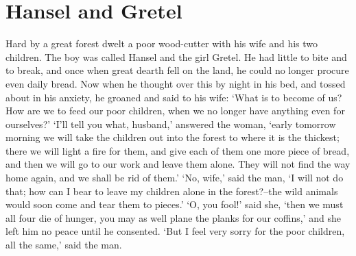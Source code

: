 
\chapter{Hansel and Gretel}

Hard by a great forest dwelt a poor wood-cutter with his wife and his two children. The boy was called Hansel and the girl Gretel. He had little to bite and to break, and once when great dearth fell on the land, he could no longer procure even daily bread. Now when he thought over this by night in his bed, and tossed about in his anxiety, he groaned and said to his wife: `What is to become of us? How are we to feed our poor children, when we no longer have anything even for ourselves?' `I'll tell you what, husband,' answered the woman, `early tomorrow morning we will take the children out into the forest to where it is the thickest; there we will light a fire for them, and give each of them one more piece of bread, and then we will go to our work and leave them alone. They will not find the way home again, and we shall be rid of them.' `No, wife,' said the man, `I will not do that; how can I bear to leave my children alone in the forest?--the wild animals would soon come and tear them to pieces.' `O, you fool!' said she, `then we must all four die of hunger, you may as well plane the planks for our coffins,' and she left him no peace until he consented. `But I feel very sorry for the poor children, all the same,' said the man.

